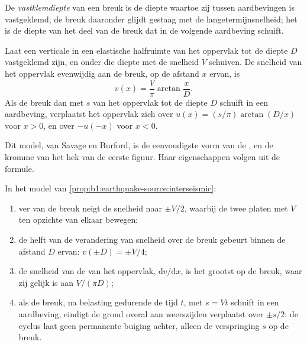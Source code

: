 \begin{definition}[Vastklemdiepte]\label{def:b1:earthquake-source:locking-depth}
De \emph{vastklemdiepte} van een breuk is de diepte waartoe zij tussen aardbevingen is vastgeklemd, de breuk daaronder glijdt gestaag met de langetermijnsnelheid; het is de diepte van het deel van de breuk dat in de volgende aardbeving schuift.
\end{definition}

\begin{proposition}\label{prop:b1:earthquake-source:interseismic}
Laat een verticale  in een elastische halfruimte van het oppervlak tot de diepte $D$ vastgeklemd zijn, en onder die diepte met de snelheid $V$ schuiven. De snelheid van het oppervlak evenwijdig aan de breuk, op de afstand $x$ ervan, is
\[
  v(x) = \frac{V}{\pi}\arctan\frac{x}{D} .
\]
Als de breuk dan met $s$ van het oppervlak tot de diepte $D$ schuift in een aardbeving, verplaatst het oppervlak zich over $u(x) = (s/\pi)\arctan(D/x)$ voor $x > 0$, en over $-u(-x)$ voor $x < 0$.
\end{proposition}
\admitted

Dit model, van Savage en Burford, is de eenvoudigste vorm van de , en de kromme van het hek van de eerste figuur. Haar eigenschappen volgen uit de formule.

\begin{proposition}\label{prop:b1:earthquake-source:profile}
In het model van \cref{prop:b1:earthquake-source:interseismic}:
\begin{enumerate}[label=(\alph*)]
  \item ver van de breuk neigt de snelheid naar $\pm V/2$, waarbij de twee platen met $V$ ten opzichte van elkaar bewegen;
  \item de helft van de verandering van snelheid over de breuk gebeurt binnen de afstand $D$ ervan: $v(\pm D) = \pm V/4$;
  \item de snelheid van de  van het oppervlak, $\mathrm dv/\mathrm dx$, is het grootst op de breuk, waar zij gelijk is aan $V/(\pi D)$;
  \item als de breuk, na belasting gedurende de tijd $t$, met $s = Vt$ schuift in een aardbeving, eindigt de grond overal aan weerszijden verplaatst over $\pm s/2$: de cyclus laat geen permanente buiging achter, alleen de verspringing $s$ op de breuk.
\end{enumerate}
\end{proposition}

